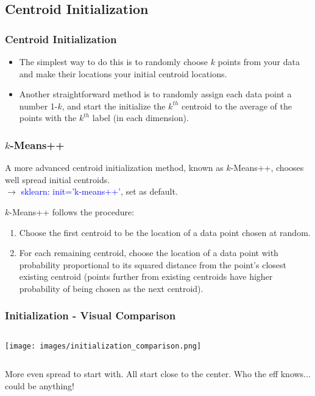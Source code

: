 \documentclass{beamer}
\begin{document}
\subsection{Centroid Initialization}
\begin{frame}
  \frametitle{Centroid Initialization}
  \begin{itemize}[<+->]
    \item The simplest way to do this is to randomly choose $k$ points from your data and make their locations your initial centroid locations. \vspace{4mm}
    \item Another straightforward method is to randomly assign each data point a number 1-$k$, and start the initialize the $k^{th}$ centroid to the average of the points with the $k^{th}$ label (in each dimension).
  \end{itemize}
\end{frame}

\begin{frame}
  \frametitle{$k$-Means++}
    A more advanced centroid initialization method, known as $k$-Means++, chooses well spread initial centroids. \\ \qquad $\rightarrow$ \textcolor{blue}{sklearn: init='k-means++'}, set as default.

   \vspace{2mm} 
    $k$-Means++ follows the procedure:
    \vspace{2mm}
    \begin{enumerate}
      \item Choose the first centroid to be the location of a data point chosen at random.
      \item For each remaining centroid, choose the location of a data point with probability proportional to its squared distance from the point's closest existing centroid (points further from existing centroids have higher probability of being chosen as the next centroid).
    \end{enumerate}
\end{frame}

\begin{frame}
  \frametitle{Initialization - Visual Comparison}
    \begin{columns}
      \column{\dimexpr\paperwidth-20pt}
      \texttt{[image: images/initialization\_comparison.png]}
    \end{columns}
    \vspace{2mm}
    \begin{columns}
        \centering
        More even spread to start with.
        \centering
        All start close to the center.
        \centering
        Who the eff knows... could be anything!
    \end{columns}
\end{frame}
\end{document}
